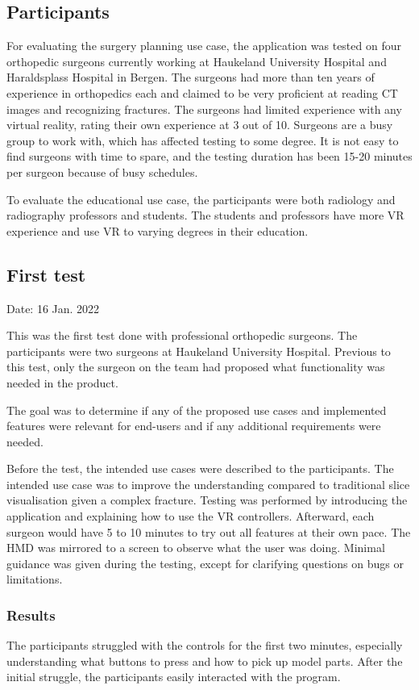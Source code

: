 \documentclass[a4paper]{report}
\begin{document}
\subsection{Participants}

For evaluating the surgery planning use case, the application was tested on four orthopedic surgeons currently working at Haukeland University Hospital and Haraldsplass Hospital in Bergen.
The surgeons had more than ten years of experience in orthopedics each and claimed to be very proficient at reading CT images and recognizing fractures.
The surgeons had limited experience with any virtual reality, rating their own experience at 3 out of 10.
Surgeons are a busy group to work with, which has affected testing to some degree. It is not easy to find surgeons with time to spare, and the testing duration has been 15-20 minutes per surgeon because of busy schedules.

To evaluate the educational use case, the participants were both radiology and radiography professors and students. The students and professors have more VR experience and use VR to varying degrees in their education.

\subsection{First test}
Date: 16 Jan. 2022

This was the first test done with professional orthopedic surgeons. The participants were two surgeons at Haukeland University Hospital. Previous to this test, only the surgeon on the team had proposed what functionality was needed in the product.

The goal was to determine if any of the proposed use cases and implemented features were relevant for end-users and if any additional requirements were needed.

Before the test, the intended use cases were described to the participants. The intended use case was to improve the understanding compared to traditional slice visualisation given a complex fracture.
Testing was performed by introducing the application and explaining how to use the VR controllers. Afterward, each surgeon would have 5 to 10 minutes to try out all features at their own pace. The HMD was mirrored to a screen to observe what the user was doing. Minimal guidance was given during the testing, except for clarifying questions on bugs or limitations.

\subsubsection{Results}
The participants struggled with the controls for the first two minutes, especially understanding what buttons to press and how to pick up model parts. After the initial struggle, the participants easily interacted with the program.
\end{document}
